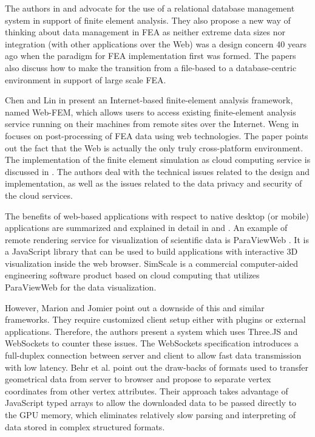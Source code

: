 The authors in \cite{Heber2007I} and \cite{Heber2007II} advocate for the use of a relational database management system in support of finite element analysis. They also propose a new way of thinking about data management in FEA as neither extreme data sizes nor integration (with other applications over the Web) was a design concern 40 years ago when the paradigm for FEA implementation first was formed. The papers also discuss how to make the transition from a file-based to a database-centric environment in support of large scale FEA.

Chen and Lin in \cite{Chen2008} present an Internet-based finite-element analysis framework, named Web-FEM, which allows users to access existing finite-element analysis service running on their machines from remote sites over the Internet. Weng in \cite{Weng2011} focuses on post-processing of FEA data using web technologies. The paper points out the fact that the Web is actually the only truly cross-platform environment. The implementation of the finite element simulation as cloud computing service is discussed in \cite{Ari2013}. The authors deal with the technical issues related to the design and implementation, as well as the issues related to the data privacy and security of the cloud services.

The benefits of web-based applications with respect to native desktop (or mobile) applications are summarized and explained in detail in \cite{Mouton2011} and \cite{Charland2011}. An example of remote rendering service for visualization of scientific data is ParaViewWeb \cite{Jourdain2011}. It is a JavaScript library that can be used to build applications with interactive 3D visualization inside the web browser. SimScale \cite{SimScale} is a commercial computer-aided engineering software product based on cloud computing that utilizes ParaViewWeb for the data visualization.

However, Marion and Jomier point out \cite{Marion2012} a downside of this and similar frameworks. They require customized client setup either with plugins or external applications. Therefore, the authors present a system which uses Three.JS and WebSockets to counter these issues. The WebSockets specification \cite{WebSockets} introduces a full-duplex connection between server and client to allow fast data transmission with low latency. Behr et al. \cite{Behr2012} point out the draw-backs of formats used to transfer geometrical data from server to browser and propose to separate vertex coordinates from other vertex attributes. Their approach takes advantage of JavaScript typed arrays to allow the downloaded data to be passed directly to the GPU memory, which eliminates relatively slow parsing and interpreting of data stored in complex structured formats.
